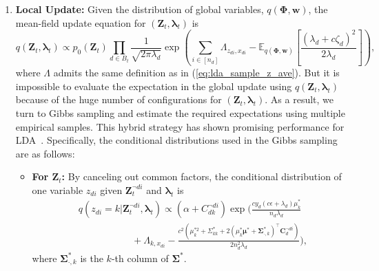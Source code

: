 \documentclass[twoside,11pt]{article}
\newcommand{\Zv}{\bm{Z}}
\newcommand{\wv}{\bm{w}}
\newcommand{\Phiv}{\bm{\Phi}}
\newcommand{\muv}{\bm \mu}
\newcommand{\lambdav}{\bm \lambda}
\newcommand{\Sigmav}{\bm \Sigma}
\newcommand{\ep}{\mathbb{E}}
\begin{document}
\begin{enumerate}
\item {\bf Local Update:} Given the distribution of global variables, $q(\Phiv,\wv)$, the mean-field update equation for $(\Zv_t, \lambdav_t)$ is
\begin{equation}\label{eq:pamedlda_zlambda}
 q(\Zv_t, \lambdav_t) \propto p_0(\Zv_t) \prod\limits_{d \in B_t} \frac{1}{\sqrt{2 \pi \lambda_d}}\exp\left( \nonumber \sum\limits_{i \in [n_d]} \Lambda_{z_{di},x_{di}}- \ep_{q(\Phiv,\wv)}\left[ \frac{(\lambda_d+c\zeta_d)^2}{2\lambda_d} \right] \right), \nonumber
\end{equation}
where $\Lambda$ admits the same definition as in (\ref{eq:lda_sample_z_ave}). But it is impossible to evaluate the expectation in the global update using $q(\Zv_t, \lambdav_t)$ because of the huge number of configurations for $(\bm{Z}_t, \bm{\lambda}_t)$. As a result, we turn to Gibbs sampling and estimate the required expectations using multiple empirical samples. This hybrid strategy has shown promising performance for LDA~\citep{mimno2012sparse}. Specifically, the conditional distributions used in the Gibbs sampling are as follows:

\begin{itemize}
\item \textbf{For $\Zv_t$:} By canceling out common factors, the conditional distribution of one variable $z_{di}$ given $\bm{Z}_{t}^{\neg di}$ and $\lambdav_t$ is
\setlength\arraycolsep{0pt}
\begin{equation}\label{eq:lda_sample_z}
\begin{array}{rl}
&\!q(z_{di} \!=\!  k| \Zv_t^{\neg di}, \lambdav_t) \!\propto\!  (\alpha \!+\! C_{dk}^{\neg di})  \! %
\exp\!\Big(\frac{c y_d(c\epsilon + \lambda_d) \mu_k^*}{n_d \lambda_d} \\
&~~~~~~~~~~~~~~~~~~~~~~~~~ + \Lambda_{k,x_{di}} - \frac{c^2 (\mu_{k}^{*2}+\Sigma_{kk}^* + 2 (\mu_k^* \muv^* + \Sigmav_{\cdot, k}^* )^\top \bm{C}_{d}^{\neg di} ) }{2 n_d^2 \lambda_d}\Big),
\end{array}
\end{equation}
where $\Sigmav_{\cdot, k}^*$ is the $k$-th column of $\Sigmav^*$.


\end{itemize}
\end{enumerate}
\end{document}
